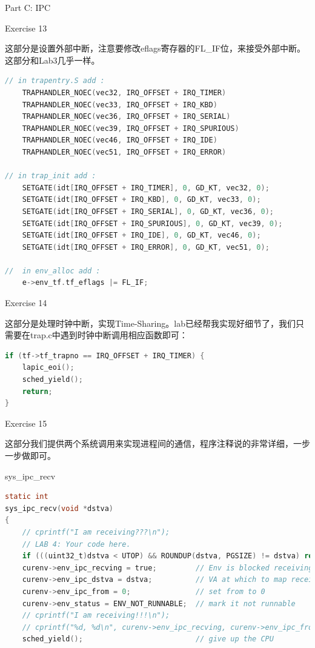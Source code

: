 \documentclass[GBK,winfonts,a4paper,10pt]{ctexart}
\begin{document}
\begin{section}{ Part C: IPC }

\begin{subsection}{ Exercise 13 }
\par
这部分是设置外部中断，注意要修改eflags寄存器的FL\_IF位，来接受外部中断。这部分和Lab3几乎一样。
\begin{lstlisting}[language = C]
// in trapentry.S add :
 	TRAPHANDLER_NOEC(vec32, IRQ_OFFSET + IRQ_TIMER)
 	TRAPHANDLER_NOEC(vec33, IRQ_OFFSET + IRQ_KBD)
 	TRAPHANDLER_NOEC(vec36, IRQ_OFFSET + IRQ_SERIAL)
 	TRAPHANDLER_NOEC(vec39, IRQ_OFFSET + IRQ_SPURIOUS)
 	TRAPHANDLER_NOEC(vec46, IRQ_OFFSET + IRQ_IDE)
 	TRAPHANDLER_NOEC(vec51, IRQ_OFFSET + IRQ_ERROR)
 	
// in trap_init add :
    SETGATE(idt[IRQ_OFFSET + IRQ_TIMER], 0, GD_KT, vec32, 0);
    SETGATE(idt[IRQ_OFFSET + IRQ_KBD], 0, GD_KT, vec33, 0);
    SETGATE(idt[IRQ_OFFSET + IRQ_SERIAL], 0, GD_KT, vec36, 0);
    SETGATE(idt[IRQ_OFFSET + IRQ_SPURIOUS], 0, GD_KT, vec39, 0);
    SETGATE(idt[IRQ_OFFSET + IRQ_IDE], 0, GD_KT, vec46, 0);
	SETGATE(idt[IRQ_OFFSET + IRQ_ERROR], 0, GD_KT, vec51, 0);

// 	in env_alloc add :
	e->env_tf.tf_eflags |= FL_IF;
\end{lstlisting}
\end{subsection}

\begin{subsection}{ Exercise 14 }
\par
这部分是处理时钟中断，实现Time-Sharing。lab已经帮我实现好细节了，我们只需要在trap.c中遇到时钟中断调用相应函数即可：
\begin{lstlisting}[language = C]
if (tf->tf_trapno == IRQ_OFFSET + IRQ_TIMER) {
	lapic_eoi();
	sched_yield();
	return;
}
\end{lstlisting}
\end{subsection}

\begin{subsection}{ Exercise 15 }
\par
这部分我们提供两个系统调用来实现进程间的通信，程序注释说的非常详细，一步一步做即可。

\begin{subsection}{ sys\_ipc\_recv }
\begin{lstlisting}[language = C]
static int
sys_ipc_recv(void *dstva)
{
	// cprintf("I am receiving???\n");
	// LAB 4: Your code here.
	if (((uint32_t)dstva < UTOP) && ROUNDUP(dstva, PGSIZE) != dstva) return -E_INVAL;
	curenv->env_ipc_recving = true;			// Env is blocked receiving
	curenv->env_ipc_dstva = dstva;			// VA at which to map received page
	curenv->env_ipc_from = 0;				// set from to 0
	curenv->env_status = ENV_NOT_RUNNABLE;	// mark it not runnable
	// cprintf("I am receiving!!!\n");
	// cprintf("%d, %d\n", curenv->env_ipc_recving, curenv->env_ipc_from);
	sched_yield();							// give up the CPU


\end{lstlisting}
\end{subsection}
\end{subsection}
\end{section}
\end{document}
